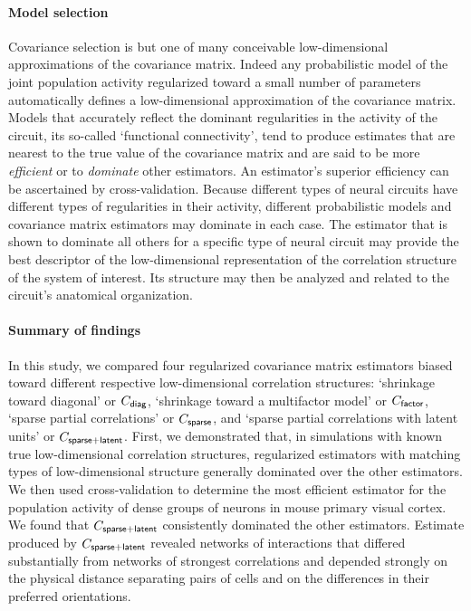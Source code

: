 \documentclass[10pt]{article}
\begin{document}
\paragraph{Model selection}
Covariance selection is but one of many conceivable low-dimensional approximations of the covariance matrix. Indeed any probabilistic model of the joint population activity regularized toward a small number of parameters automatically defines a low-dimensional approximation of the covariance matrix. Models that accurately reflect the dominant regularities in the activity of the circuit, its so-called `functional connectivity', tend to produce estimates that are nearest to the true value of the covariance matrix and are said to be more \emph{efficient} or to \emph{dominate} other estimators. An estimator's superior efficiency can be ascertained by cross-validation.  Because different types of neural circuits have different types of regularities in their activity, different probabilistic models and covariance matrix estimators may dominate in each case. The estimator that is shown to dominate all others for a specific type of neural circuit may provide the best descriptor of the low-dimensional representation of the correlation structure of the system of interest. Its structure may then be analyzed and related to the circuit's anatomical organization.  
\paragraph{Summary of findings}
In this study, we compared four regularized covariance matrix estimators biased toward different respective low-dimensional correlation structures: `shrinkage toward diagonal' or $C_{\sf diag}$, `shrinkage toward a multifactor model' or $C_{\sf factor}$, `sparse partial correlations' or $C_{\sf sparse}$, and `sparse partial correlations with latent units' or $C_{\sf sparse+latent}$.  First, we demonstrated that, in simulations with known true low-dimensional correlation structures, regularized estimators with matching types of low-dimensional structure generally dominated over the other estimators. We then used cross-validation to determine the most efficient estimator for the population activity of dense groups of neurons in mouse primary visual cortex. We found that $C_{\sf sparse+latent}$ consistently dominated the other estimators.  Estimate produced by $C_{\sf sparse+latent}$ revealed networks of interactions that differed substantially from networks of strongest correlations and depended strongly on the physical distance separating pairs of cells and on the differences in their preferred orientations.
\end{document}
